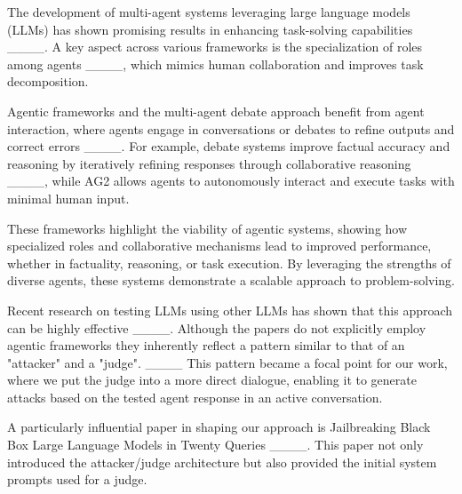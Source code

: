 The development of multi-agent systems leveraging large language models (LLMs) has shown promising results in enhancing task-solving capabilities ____. A key aspect across various frameworks is the specialization of roles among agents ____, which mimics human collaboration and improves task decomposition.

Agentic frameworks and the multi-agent debate approach benefit from agent interaction, where agents engage in conversations or debates to refine outputs and correct errors ____. For example, debate systems improve factual accuracy and reasoning by iteratively refining responses through collaborative reasoning ____, while AG2 allows agents to autonomously interact and execute tasks with minimal human input.

These frameworks highlight the viability of agentic systems, showing how specialized roles and collaborative mechanisms lead to improved performance, whether in factuality, reasoning, or task execution. By leveraging the strengths of diverse agents, these systems demonstrate a scalable approach to problem-solving.

Recent research on testing LLMs using other LLMs has shown that this approach can be highly effective ____. Although the papers do not explicitly employ agentic frameworks they inherently reflect a pattern similar to that of an "attacker" and a "judge". ____  This pattern became a focal point for our work, where we put the judge into a more direct dialogue, enabling it to generate attacks based on the tested agent response in an active conversation.

A particularly influential paper in shaping our approach is Jailbreaking Black Box Large Language Models in Twenty Queries ____. This paper not only introduced the attacker/judge architecture but also provided the initial system prompts used for a judge.